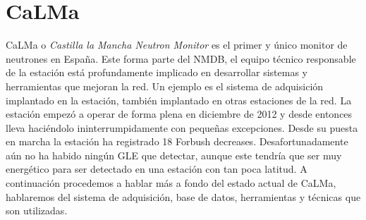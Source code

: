 \section{CaLMa}
	CaLMa\cite{Medina2013} o \emph{Castilla la Mancha Neutron Monitor} es el primer y único monitor de neutrones en España. Este forma parte del
	NMDB, el equipo técnico responsable de la estación está profundamente implicado en desarrollar sistemas y herramientas que mejoran la red. Un
	ejemplo es el sistema de adquisición implantado en la estación, también implantado en otras estaciones de la red. La estación empezó a operar
	de forma plena en diciembre de 2012 y desde entonces lleva haciéndolo ininterrumpidamente con pequeñas excepciones. Desde su puesta en marcha
	la estación ha registrado 18 Forbush decreases. Desafortunadamente aún no ha habido ningún GLE que detectar, aunque este tendría que ser muy
	energético para ser detectado en una estación con tan poca latitud. A continuación procedemos a hablar más a fondo del estado actual de CaLMa,
	hablaremos del sistema de adquisición, base de datos, herramientas y técnicas que son utilizadas.
